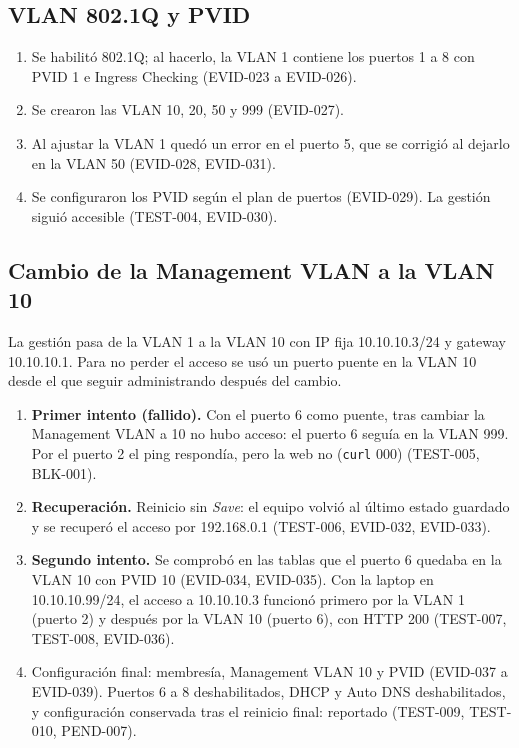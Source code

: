 \documentclass[11pt,a4paper]{article}
\begin{document}
\subsection{VLAN 802.1Q y PVID}
\begin{enumerate}
  \item Se habilitó 802.1Q; al hacerlo, la VLAN 1 contiene los puertos 1 a 8 con PVID 1 e Ingress Checking (EVID-023 a EVID-026).
  \item Se crearon las VLAN 10, 20, 50 y 999 (EVID-027).
  \item Al ajustar la VLAN 1 quedó un error en el puerto 5, que se corrigió al dejarlo en la VLAN 50 (EVID-028, EVID-031).
  \item Se configuraron los PVID según el plan de puertos (EVID-029). La gestión siguió accesible (TEST-004, EVID-030).
\end{enumerate}

\subsection{Cambio de la Management VLAN a la VLAN 10}
La gestión pasa de la VLAN 1 a la VLAN 10 con IP fija 10.10.10.3/24 y gateway 10.10.10.1. Para no perder el acceso se usó un puerto puente en la VLAN 10 desde el que seguir administrando después del cambio.

\begin{enumerate}
  \item \textbf{Primer intento (fallido).} Con el puerto 6 como puente, tras cambiar la Management VLAN a 10 no hubo acceso: el puerto 6 seguía en la VLAN 999. Por el puerto 2 el ping respondía, pero la web no (\texttt{curl} 000) (TEST-005, BLK-001).
  \item \textbf{Recuperación.} Reinicio sin \emph{Save}: el equipo volvió al último estado guardado y se recuperó el acceso por 192.168.0.1 (TEST-006, EVID-032, EVID-033).
  \item \textbf{Segundo intento.} Se comprobó en las tablas que el puerto 6 quedaba en la VLAN 10 con PVID 10 (EVID-034, EVID-035). Con la laptop en 10.10.10.99/24, el acceso a 10.10.10.3 funcionó primero por la VLAN 1 (puerto 2) y después por la VLAN 10 (puerto 6), con HTTP 200 (TEST-007, TEST-008, EVID-036).
  \item Configuración final: membresía, Management VLAN 10 y PVID (EVID-037 a EVID-039). Puertos 6 a 8 deshabilitados, DHCP y Auto DNS deshabilitados, y configuración conservada tras el reinicio final: reportado (TEST-009, TEST-010, PEND-007).
\end{enumerate}
\end{document}
